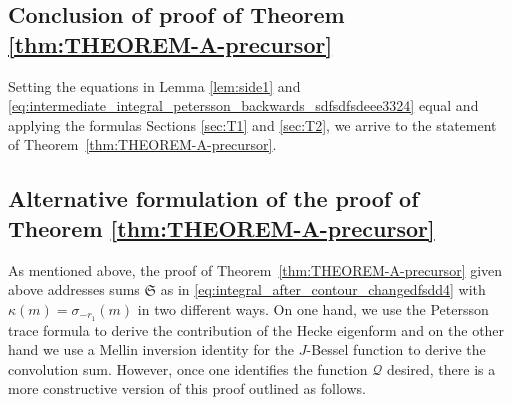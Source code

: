 \documentclass[]{article}
\newcommand{\mathcalSsumdef}{\mathfrak{S}}
\begin{document}
\subsection{Conclusion of proof of Theorem \ref{thm:THEOREM-A-precursor}}\label{sec:conclusion}



Setting the equations in Lemma \ref{lem:side1} and \eqref{eq:intermediate_integral_petersson_backwards_sdfsdfsdeee3324} equal and applying the formulas Sections \ref{sec:T1} and \ref{sec:T2}, we arrive to the statement of Theorem~\ref{thm:THEOREM-A-precursor}. 





\subsection{Alternative formulation of the proof of Theorem \ref{thm:THEOREM-A-precursor}}\label{sec:sketches}
As mentioned above, the proof of Theorem~\ref{thm:THEOREM-A-precursor} given above addresses sums $\mathcalSsumdef$ as in \eqref{eq:integral_after_contour_changedfsdd4}  with $\kappa(m) =\sigma_{-r_1}(m)$ in two different ways. On one hand,  we use the Petersson trace formula to derive the contribution of the Hecke eigenform and on the other hand we use a Mellin inversion identity for the $J$-Bessel function to derive the convolution sum. However, once one identifies the function $\mathcal{Q}$ desired,  there is a more constructive version of this proof outlined as follows.
\end{document}
